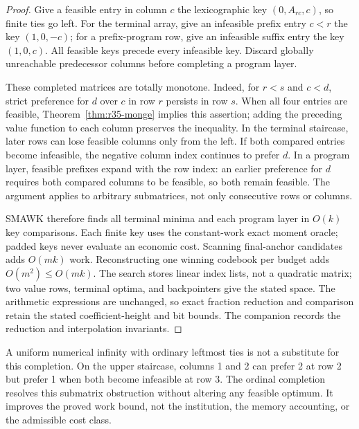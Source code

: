 \begin{proof}
Give a feasible entry in column $c$ the lexicographic key $(0,A_{rc},c)$, so finite ties go left. For the terminal array, give an infeasible prefix entry $c<r$ the key $(1,0,-c)$; for a prefix-program row, give an infeasible suffix entry the key $(1,0,c)$. All feasible keys precede every infeasible key. Discard globally unreachable predecessor columns before completing a program layer.

These completed matrices are totally monotone. Indeed, for $r<s$ and $c<d$, strict preference for $d$ over $c$ in row $r$ persists in row $s$. When all four entries are feasible, Theorem~\ref{thm:r35-monge} implies this assertion; adding the preceding value function to each column preserves the inequality. In the terminal staircase, later rows can lose feasible columns only from the left. If both compared entries become infeasible, the negative column index continues to prefer $d$. In a program layer, feasible prefixes expand with the row index: an earlier preference for $d$ requires both compared columns to be feasible, so both remain feasible. The argument applies to arbitrary submatrices, not only consecutive rows or columns.

SMAWK therefore finds all terminal minima and each program layer in $O(k)$ key comparisons. Each finite key uses the constant-work exact moment oracle; padded keys never evaluate an economic cost. Scanning final-anchor candidates adds $O(mk)$ work. Reconstructing one winning codebook per budget adds $O(m^2)\leq O(mk)$. The search stores linear index lists, not a quadratic matrix; two value rows, terminal optima, and backpointers give the stated space. The arithmetic expressions are unchanged, so exact fraction reduction and comparison retain the stated coefficient-height and bit bounds. The companion records the reduction and interpolation invariants.\end{proof}

A uniform numerical infinity with ordinary leftmost ties is not a substitute for this completion. On the upper staircase, columns 1 and 2 can prefer 2 at row 2 but prefer 1 when both become infeasible at row 3. The ordinal completion resolves this submatrix obstruction without altering any feasible optimum. It improves the proved work bound, not the institution, the memory accounting, or the admissible cost class.
